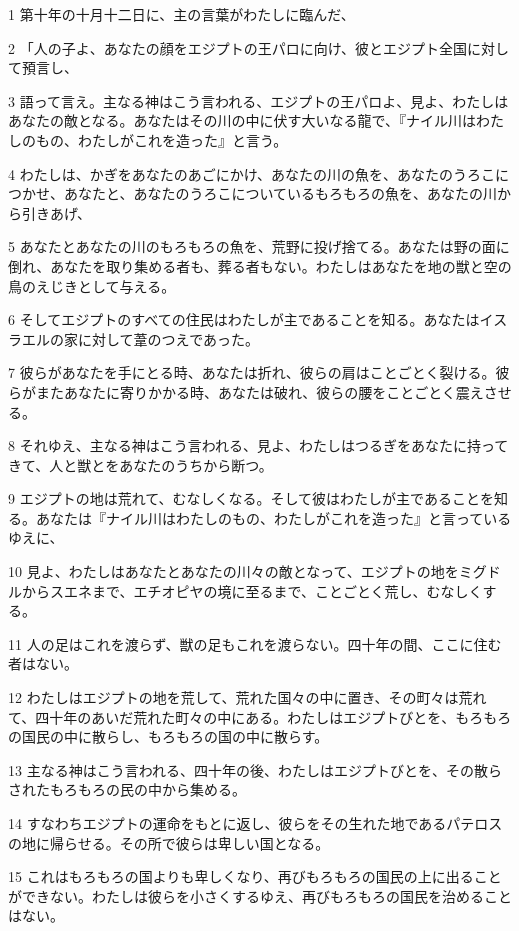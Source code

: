 \par 1 第十年の十月十二日に、主の言葉がわたしに臨んだ、
\par 2 「人の子よ、あなたの顔をエジプトの王パロに向け、彼とエジプト全国に対して預言し、
\par 3 語って言え。主なる神はこう言われる、エジプトの王パロよ、見よ、わたしはあなたの敵となる。あなたはその川の中に伏す大いなる龍で、『ナイル川はわたしのもの、わたしがこれを造った』と言う。
\par 4 わたしは、かぎをあなたのあごにかけ、あなたの川の魚を、あなたのうろこにつかせ、あなたと、あなたのうろこについているもろもろの魚を、あなたの川から引きあげ、
\par 5 あなたとあなたの川のもろもろの魚を、荒野に投げ捨てる。あなたは野の面に倒れ、あなたを取り集める者も、葬る者もない。わたしはあなたを地の獣と空の鳥のえじきとして与える。
\par 6 そしてエジプトのすべての住民はわたしが主であることを知る。あなたはイスラエルの家に対して葦のつえであった。
\par 7 彼らがあなたを手にとる時、あなたは折れ、彼らの肩はことごとく裂ける。彼らがまたあなたに寄りかかる時、あなたは破れ、彼らの腰をことごとく震えさせる。
\par 8 それゆえ、主なる神はこう言われる、見よ、わたしはつるぎをあなたに持ってきて、人と獣とをあなたのうちから断つ。
\par 9 エジプトの地は荒れて、むなしくなる。そして彼はわたしが主であることを知る。あなたは『ナイル川はわたしのもの、わたしがこれを造った』と言っているゆえに、
\par 10 見よ、わたしはあなたとあなたの川々の敵となって、エジプトの地をミグドルからスエネまで、エチオピヤの境に至るまで、ことごとく荒し、むなしくする。
\par 11 人の足はこれを渡らず、獣の足もこれを渡らない。四十年の間、ここに住む者はない。
\par 12 わたしはエジプトの地を荒して、荒れた国々の中に置き、その町々は荒れて、四十年のあいだ荒れた町々の中にある。わたしはエジプトびとを、もろもろの国民の中に散らし、もろもろの国の中に散らす。
\par 13 主なる神はこう言われる、四十年の後、わたしはエジプトびとを、その散らされたもろもろの民の中から集める。
\par 14 すなわちエジプトの運命をもとに返し、彼らをその生れた地であるパテロスの地に帰らせる。その所で彼らは卑しい国となる。
\par 15 これはもろもろの国よりも卑しくなり、再びもろもろの国民の上に出ることができない。わたしは彼らを小さくするゆえ、再びもろもろの国民を治めることはない。
